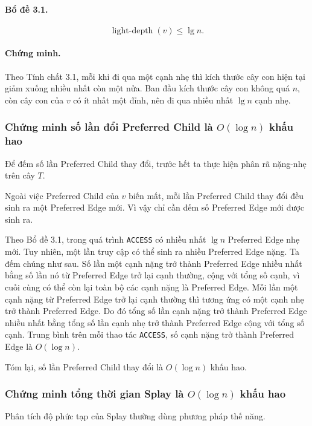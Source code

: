\documentclass[11pt]{article}
\begin{document}
\paragraph{Bổ đề 3.1.}
\[
  \operatorname{light\mbox{-}depth}(v) \le \lg n.
\]

\paragraph{Chứng minh.}
Theo Tính chất 3.1, mỗi khi đi qua một cạnh nhẹ thì kích thước cây con hiện tại
giảm xuống nhiều nhất còn một nửa. Ban đầu kích thước cây con không quá $n$,
còn cây con của $v$ có ít nhất một đỉnh, nên đi qua nhiều nhất $\lg n$ cạnh
nhẹ.

\subsubsection{Chứng minh số lần đổi Preferred Child là
\texorpdfstring{$O(\log n)$}{O(log n)} khấu hao}

Để đếm số lần Preferred Child thay đổi, trước hết ta thực hiện phân rã nặng-nhẹ
trên cây $T$.

Ngoài việc Preferred Child của $v$ biến mất, mỗi lần Preferred Child thay đổi
đều sinh ra một Preferred Edge mới. Vì vậy chỉ cần đếm số Preferred Edge mới
được sinh ra.

Theo Bổ đề 3.1, trong quá trình \texttt{ACCESS} có nhiều nhất $\lg n$ Preferred
Edge nhẹ mới. Tuy nhiên, một lần truy cập có thể sinh ra nhiều Preferred Edge
nặng. Ta đếm chúng như sau. Số lần một cạnh nặng trở thành Preferred Edge nhiều
nhất bằng số lần nó từ Preferred Edge trở lại cạnh thường, cộng với tổng số
cạnh, vì cuối cùng có thể còn lại toàn bộ các cạnh nặng là Preferred Edge.
Mỗi lần một cạnh nặng từ Preferred Edge trở lại cạnh thường thì tương ứng có
một cạnh nhẹ trở thành Preferred Edge. Do đó tổng số lần cạnh nặng trở thành
Preferred Edge nhiều nhất bằng tổng số lần cạnh nhẹ trở thành Preferred Edge
cộng với tổng số cạnh. Trung bình trên mỗi thao tác \texttt{ACCESS}, số cạnh
nặng trở thành Preferred Edge là $O(\log n)$.

Tóm lại, số lần Preferred Child thay đổi là $O(\log n)$ khấu hao.

\subsubsection{Chứng minh tổng thời gian Splay là
\texorpdfstring{$O(\log n)$}{O(log n)} khấu hao}

Phân tích độ phức tạp của Splay thường dùng phương pháp thế năng.
\end{document}
